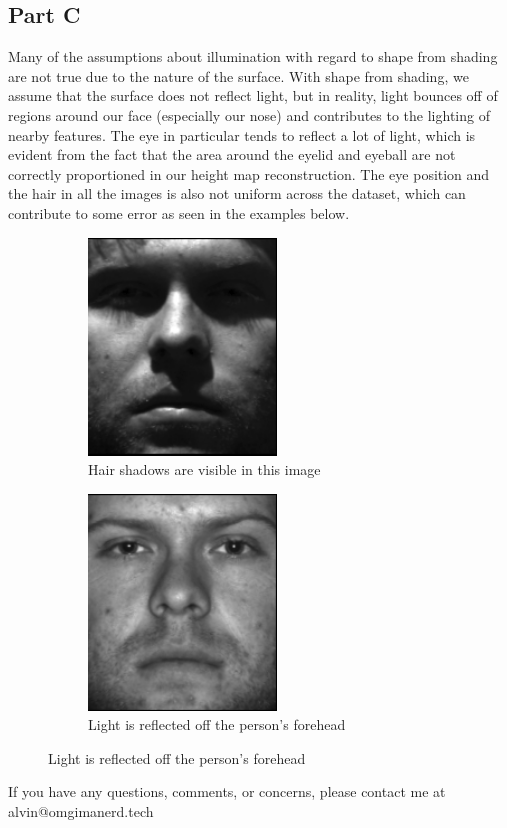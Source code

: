 \documentclass{math}
\begin{document}
\subsection*{Part C}
Many of the assumptions about illumination with regard to shape from shading are
not true due to the nature of the surface. With shape from shading, we assume
that the surface does not reflect light, but in reality, light bounces off of
regions around our face (especially our nose) and contributes to the lighting of
nearby features. The eye in particular tends to reflect a lot of light, which is
evident from the fact that the area around the eyelid and eyeball are not
correctly proportioned in our height map reconstruction. The eye position and
the hair in all the images is also not uniform across the dataset, which can
contribute to some error as seen in the examples below.
\begin{figure}[H]
  \begin{subfigure}{0.5\linewidth}
    \centering
    \includegraphics[width=5cm]{assets/hw_03_yaleB01_01.png}
    \caption{Hair shadows are visible in this image}
  \end{subfigure}
  \begin{subfigure}{0.5\linewidth}
    \centering
    \includegraphics[width=5cm]{assets/hw_03_yaleB01_02.png}
    \caption{Light is reflected off the person's forehead}
  \end{subfigure}
\end{figure}

\begin{center}
  If you have any questions, comments, or concerns, please contact me at
  alvin@omgimanerd.tech
\end{center}
\end{document}
